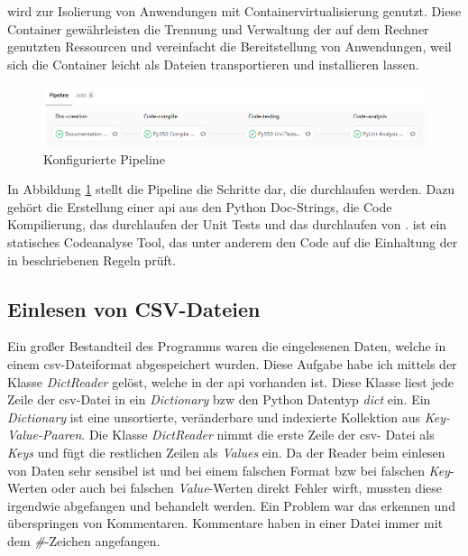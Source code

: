 \cite{Docker} wird zur Isolierung von Anwendungen mit Containervirtualisierung genutzt. Diese 
Container gewährleisten die Trennung und Verwaltung der auf dem Rechner genutzten Ressourcen 
und vereinfacht die Bereitstellung von Anwendungen, weil sich die Container leicht als Dateien 
transportieren und installieren lassen.

\begin{figure}[H]
	\centering
	\includegraphics[width=1\textwidth, height=0.2\textwidth]{graphics/pipeline.png}
	\caption{Konfigurierte Pipeline}
	\label{fig:pipeline}
\end{figure}

In Abbildung \ref{fig:pipeline} stellt die Pipeline die Schritte dar, die durchlaufen werden.
Dazu gehört die Erstellung einer \ac{api} aus den Python Doc-Strings, die Code Kompilierung, 
das durchlaufen der Unit Tests und das durchlaufen von \cite{Pylint}. \cite{Pylint} ist ein 
statisches Codeanalyse Tool, das unter anderem den Code auf die Einhaltung der in \cite{PEP8} 
beschriebenen Regeln prüft.


\subsection{Einlesen von CSV-Dateien}
\label{subsec:read_csv}

Ein großer Bestandteil des Programms waren die eingelesenen Daten, welche in einem \ac{csv}-Dateiformat abgespeichert wurden. Diese Aufgabe habe ich mittels der Klasse \textit{DictReader} 
gelöst, welche in der \cite{Python} \ac{api} vorhanden ist. Diese Klasse liest jede Zeile der 
\ac{csv}-Datei in ein \textit{Dictionary} \ac{bzw} den Python Datentyp \textit{dict} ein. Ein 
\textit{Dictionary} ist eine unsortierte, veränderbare und indexierte Kollektion aus 
\textit{Key-Value-Paaren}. Die Klasse \textit{DictReader} nimmt die erste Zeile der \ac{csv}-
Datei als \textit{Keys} und fügt die restlichen Zeilen als \textit{Values} ein. 
Da der Reader beim einlesen von Daten sehr sensibel ist und bei einem falschen Format \ac{bzw} 
bei falschen \textit{Key}-Werten oder auch bei falschen \textit{Value}-Werten direkt Fehler 
wirft, mussten diese irgendwie abgefangen und behandelt werden. Ein Problem war das erkennen 
und überspringen von Kommentaren. Kommentare haben in einer Datei immer mit dem \textit{\#}-Zeichen angefangen. 
\pagebreak

